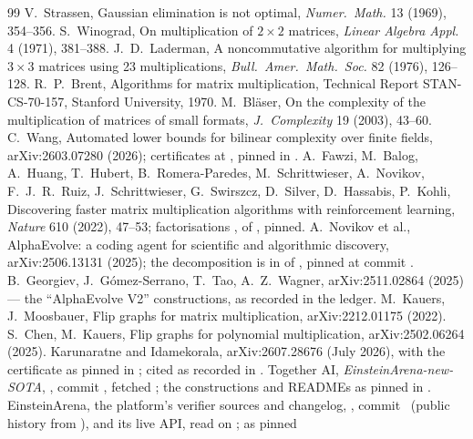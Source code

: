 \documentclass[11pt]{article}
\begin{document}
\begin{thebibliography}{99}\small
{} V.~Strassen, Gaussian elimination is not optimal, \emph{Numer.\ Math.} 13 (1969), 354--356.
 S.~Winograd, On multiplication of $2\times2$ matrices, \emph{Linear Algebra Appl.} 4 (1971), 381--388.
 J.~D.~Laderman, A noncommutative algorithm for multiplying $3\times3$ matrices using 23 multiplications, \emph{Bull.\ Amer.\ Math.\ Soc.} 82 (1976), 126--128.
 R.~P.~Brent, Algorithms for matrix multiplication, Technical Report STAN-CS-70-157, Stanford University, 1970.
 M.~Bl\"aser, On the complexity of the multiplication of matrices of small formats, \emph{J.\ Complexity} 19 (2003), 43--60.
 C.~Wang, Automated lower bounds for bilinear complexity over finite fields, arXiv:2603.07280 (2026); certificates at , pinned in .
 A.~Fawzi, M.~Balog, A.~Huang, T.~Hubert, B.~Romera-Paredes, M.~Schrittwieser, A.~Novikov, F.~J.~R.~Ruiz, J.~Schrittwieser, G.~Swirszcz, D.~Silver, D.~Hassabis, P.~Kohli, Discovering faster matrix multiplication algorithms with reinforcement learning, \emph{Nature} 610 (2022), 47--53; factorisations ,  of , pinned.
 A.~Novikov et al., AlphaEvolve: a coding agent for scientific and algorithmic discovery, arXiv:2506.13131 (2025); the decomposition is in  of , pinned at commit \AECommit.
 B.~Georgiev, J.~G\'omez-Serrano, T.~Tao, A.~Z.~Wagner, arXiv:2511.02864 (2025) --- the ``AlphaEvolve V2'' constructions, as recorded in the ledger.
 M.~Kauers, J.~Moosbauer, Flip graphs for matrix multiplication, arXiv:2212.01175 (2022).
 S.~Chen, M.~Kauers, Flip graphs for polynomial multiplication, arXiv:2502.06264 (2025).
 Karunaratne and Idamekorala, arXiv:2607.28676 (July 2026), with the certificate  as pinned in ; cited as recorded in .
 Together AI, \emph{EinsteinArena-new-SOTA}, , commit \EACommit, fetched \EAFetched; the constructions and READMEs as pinned in .
 EinsteinArena, the platform's verifier sources and changelog, \EAPlatformRepo, commit
\EAPlatformHead\ (public history from \EAPlatformFrom), and its live API, read on \EARuleAsOf; as pinned

\end{thebibliography}
\end{document}
